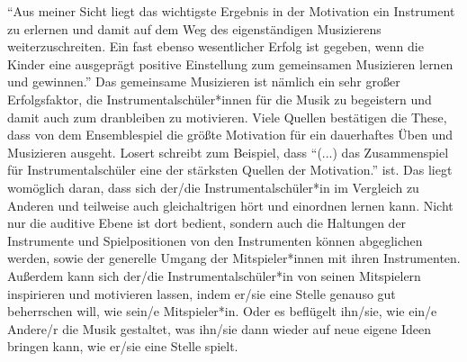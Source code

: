 \enquote{Aus meiner Sicht liegt das wichtigste Ergebnis in der Motivation ein
Instrument zu erlernen und damit auf dem Weg des eigenständigen Musizierens
weiterzuschreiten. Ein fast ebenso wesentlicher Erfolg ist gegeben, wenn die
Kinder eine ausgeprägt positive Einstellung zum gemeinsamen Musizieren lernen
und gewinnen.}\autocite[40]{ernst:die_zukunftsfaehige_musikschule} Das
gemeinsame Musizieren ist nämlich ein sehr großer Erfolgsfaktor, die
Instrumentalschüler*innen für die Musik zu begeistern und damit auch zum
dranbleiben zu motivieren. Viele Quellen bestätigen die These, dass von dem
Ensemblespiel die größte Motivation für ein dauerhaftes Üben und Musizieren
ausgeht. Losert schreibt zum Beispiel, dass \enquote{(...) das Zusammenspiel für
Instrumentalschüler eine der stärksten Quellen der Motivation.} ist.
\autocite[92]{losert:die_kunst_zu_unterrichten} Das liegt womöglich daran, dass
sich der/die Instrumentalschüler*in im Vergleich zu Anderen und teilweise auch
gleichaltrigen hört und einordnen lernen kann. Nicht nur die auditive Ebene ist
dort bedient, sondern auch die Haltungen der Instrumente und Spielpositionen von
den Instrumenten können abgeglichen werden, sowie der generelle Umgang der
Mitspieler*innen mit ihren Instrumenten. Außerdem kann sich der/die
Instrumentalschüler*in von seinen Mitspielern inspirieren und motivieren lassen,
indem er/sie eine Stelle genauso gut beherrschen will, wie sein/e Mitspieler*in.
Oder es beflügelt ihn/sie, wie ein/e Andere/r die Musik gestaltet, was ihn/sie
dann wieder auf neue eigene Ideen bringen kann, wie er/sie eine Stelle spielt.

